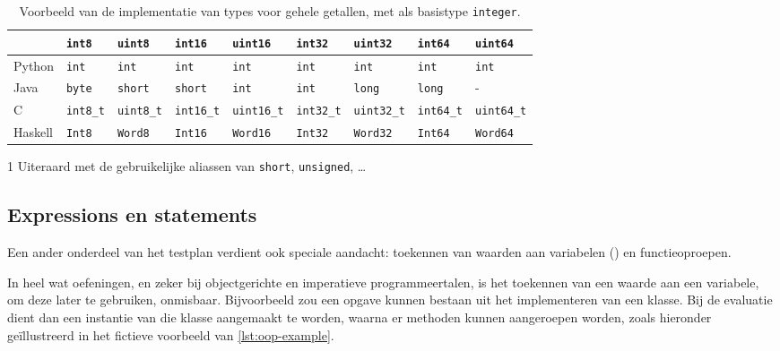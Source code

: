 \begin{table}[b]
    \centering
    \caption{Voorbeeld van de implementatie van types voor gehele getallen, met als basistype \texttt{integer}.}
    \label{tab:vertaling}
    \begin{threeparttable}
        \begin{tabular}{|l|llllllll|}
            \hline
                       & \texttt{int8} & \texttt{uint8} & \texttt{int16} & \texttt{uint16} & \texttt{int32} & \texttt{uint32} & \texttt{int64} & \texttt{uint64} \\
            \hline
            Python     & \texttt{int}  & \texttt{int}   & \texttt{int}   & \texttt{int}    & \texttt{int}   & \texttt{int}    & \texttt{int}   & \texttt{int}    \\
            Java       & \texttt{byte} & \texttt{short} & \texttt{short} & \texttt{int}    & \texttt{int}   & \texttt{long}   & \texttt{long}  & -               \\
            C\tnote{1} & \texttt{int8\_t} & \texttt{uint8\_t} & \texttt{int16\_t} & \texttt{uint16\_t} & \texttt{int32\_t} & \texttt{uint32\_t} & \texttt{int64\_t} & \texttt{uint64\_t} \\
            Haskell    & \texttt{Int8} & \texttt{Word8} & \texttt{Int16} & \texttt{Word16} & \texttt{Int32} & \texttt{Word32} & \texttt{Int64} & \texttt{Word64} \\
            \hline
        \end{tabular}
    \begin{tablenotes}
        \item[1] Uiteraard met de gebruikelijke aliassen van \texttt{short}, \texttt{unsigned}, \ldots
    \end{tablenotes}
    \end{threeparttable}
\end{table}

\subsection{Expressions en statements}\label{subsec:expressions-and-statements}

Een ander onderdeel van het testplan verdient ook speciale aandacht: toekennen van waarden aan variabelen () en functieoproepen.

In heel wat oefeningen, en zeker bij objectgerichte en imperatieve programmeertalen, is het toekennen van een waarde aan een variabele, om deze later te gebruiken, onmisbaar.
Bijvoorbeeld zou een opgave kunnen bestaan uit het implementeren van een klasse.
Bij de evaluatie dient dan een instantie van die klasse aangemaakt te worden, waarna er methoden kunnen aangeroepen worden, zoals hieronder geïllustreerd in het fictieve voorbeeld van \cref{lst:oop-example}.

